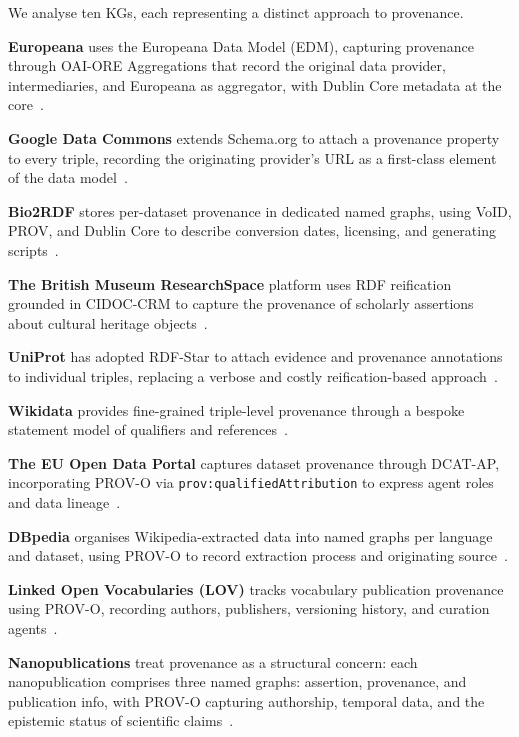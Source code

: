 \documentclass[runningheads]{llncs}
\newenvironment{onlyextended}{\ignorespaces}{\ignorespacesafterend}
\begin{document}
\begin{onlyextended}
We analyse ten KGs, each representing a distinct approach 
to provenance.

\textbf{Europeana} uses the Europeana Data Model (EDM), 
capturing provenance through OAI-ORE Aggregations that 
record the original data provider, intermediaries, and 
Europeana as aggregator, with Dublin Core metadata at the 
core~\cite{haslhofer2011}.

\textbf{Google Data Commons} extends Schema.org to attach 
a provenance property to every triple, recording the 
originating provider's URL as a first-class element of the 
data model~\cite{datacommons,schemaorg}.

\textbf{Bio2RDF} stores per-dataset provenance in 
dedicated named graphs, using VoID, PROV, and Dublin Core 
to describe conversion dates, licensing, and generating 
scripts~\cite{callahan2013}.

\textbf{The British Museum ResearchSpace} platform uses 
RDF reification grounded in CIDOC-CRM to capture the 
provenance of scholarly assertions about cultural heritage 
objects~\cite{researchspace}.

\textbf{UniProt} has adopted RDF-Star to attach evidence 
and provenance annotations to individual triples, 
replacing a verbose and costly reification-based 
approach~\cite{rdfstar,uniprot}.

\textbf{Wikidata} provides fine-grained triple-level 
provenance through a bespoke statement model of 
qualifiers and references~\cite{vrandevcic2014,hernandez2015}.

\textbf{The EU Open Data Portal} captures dataset 
provenance through DCAT-AP, incorporating PROV-O via 
\texttt{prov:qualifiedAttribution} to express agent roles 
and data lineage~\cite{provo,dcatap}.

\textbf{DBpedia} organises Wikipedia-extracted data into 
named graphs per language and dataset, using PROV-O to 
record extraction process and originating 
source~\cite{dbpedia}.

\textbf{Linked Open Vocabularies (LOV)} tracks vocabulary 
publication provenance using PROV-O, recording authors, 
publishers, versioning history, and curation 
agents~\cite{lov}.

\textbf{Nanopublications} treat provenance as a structural 
concern: each nanopublication comprises three named graphs:  assertion, provenance, and publication info, with 
PROV-O capturing authorship, temporal data, and the 
epistemic status of scientific claims~\cite{nanopub}.
\end{onlyextended}
\end{document}
